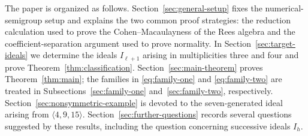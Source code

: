The paper is organized as follows.  Section~\ref{sec:general-setup} fixes the
numerical-semigroup setup and explains the two common proof strategies: the
reduction calculation used to prove the Cohen--Macaulayness of the Rees
algebra and the coefficient-separation argument used to prove normality.  In
Section~\ref{sec:target-ideals} we determine the ideals $I_{\ell+1}$ arising
in multiplicities three and four and prove
Theorem~\ref{thm:classification}.
Section~\ref{sec:main-theorem} proves
Theorem~\ref{thm:main}; the families in \eqref{eq:family-one} and
\eqref{eq:family-two} are treated in Subsections~\ref{sec:family-one}
and~\ref{sec:family-two}, respectively.
Section~\ref{sec:nonsymmetric-example} is devoted to the seven-generated ideal
arising from $\langle4,9,15\rangle$.
Section~\ref{sec:further-questions} records several questions suggested by
these results, including the question concerning successive ideals $I_h$.

